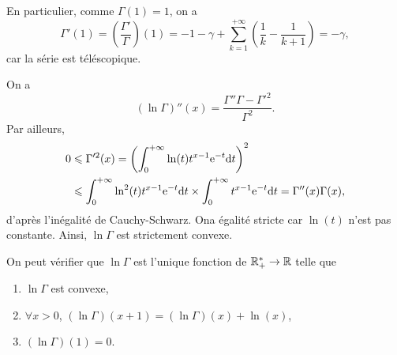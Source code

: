 \documentclass[12pt]{article}
\begin{document}
\begin{remark}
    En particulier, comme $\Gamma(1)=1$, on a 
        \begin{equation*}
            \Gamma'(1)=\left(\frac{\Gamma'}{\Gamma}\right)(1)=-1-\gamma+\sum_{k=1}^{+\infty}\left(\frac{1}{k}-\frac{1}{k+1}\right)=-\gamma,
        \end{equation*}
    car la série est téléscopique.
\end{remark}

\begin{remark}
    On a 
    \begin{equation*}
        \left(\ln\Gamma\right)''(x)=\frac{\Gamma''\Gamma-\Gamma'^{2}}{\Gamma^{2}}.
    \end{equation*}
    Par ailleurs,
    \begin{align*}
        0
        &\leqslant\Gamma'^{2}(x)=\left(\int_{0}^{+\infty}\ln(t)t^{x-1}\mathrm{e}^{-t}\mathrm{d} t\right)^{2}\\
        &\leqslant\int_{0}^{+\infty}\ln^{2}(t)t^{x-1}\mathrm{e}^{-t}\mathrm{d} t\times\int_{0}^{+\infty}t^{x-1}\mathrm{e}^{-t}\mathrm{d} t=\Gamma''(x)\Gamma(x),
    \end{align*}
    d'après l'inégalité de Cauchy-Schwarz. Ona égalité stricte car $\ln(t)$ n'est pas constante. Ainsi, $\ln\Gamma$ est strictement convexe.
\end{remark}

\begin{remark}
    On peut vérifier que $\ln\Gamma$ est l'unique fonction de $\mathbb{R}_{+}^{*}\to\mathbb{R}$ telle que 
    \begin{enumerate}
        \item $\ln\Gamma$ est convexe,
        \item $\forall x>0$, $\left(\ln\Gamma\right)(x+1)=\left(\ln\Gamma\right)(x)+\ln(x)$,
        \item $\left(\ln\Gamma\right)(1)=0$.
    \end{enumerate}
\end{remark}
\end{document}

